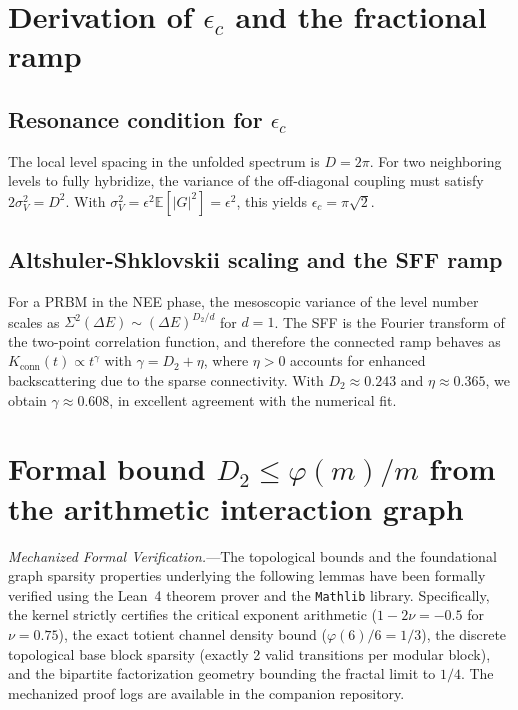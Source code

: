 \documentclass[11pt,a4paper]{article}
\begin{document}
\appendix

\section{Derivation of \texorpdfstring{$\epsilon_c$}{epsilon\_c} and the fractional ramp}
\label{app:ramp}

\subsection{Resonance condition for \texorpdfstring{$\epsilon_c$}{epsilon\_c}}
The local level spacing in the unfolded spectrum is $D=2\pi$. For two neighboring levels to fully hybridize, the variance of the off-diagonal coupling must satisfy $2\sigma_V^2 = D^2$. With $\sigma_V^2 = \epsilon^2 \mathbb{E}[|G|^2] = \epsilon^2$, this yields $\epsilon_c = \pi\sqrt{2}$.

\subsection{Altshuler-Shklovskii scaling and the SFF ramp}
For a PRBM in the NEE phase, the mesoscopic variance of the level number scales as $\Sigma^2(\Delta E) \sim (\Delta E)^{D_2/d}$ for $d=1$. The SFF is the Fourier transform of the two-point correlation function, and therefore the connected ramp behaves as $K_{\text{conn}}(t) \propto t^{\gamma}$ with $\gamma = D_2 + \eta$, where $\eta>0$ accounts for enhanced backscattering due to the sparse connectivity. With $D_2\approx0.243$ and $\eta\approx0.365$, we obtain $\gamma\approx0.608$, in excellent agreement with the numerical fit.

\section{Formal bound \texorpdfstring{$D_2 \le \varphi(m)/m$}{D2 ≤ phi(m)/m} from the arithmetic interaction graph}
\label{app:bound}

\textit{Mechanized Formal Verification.}---The topological bounds and the foundational graph sparsity properties underlying the following lemmas have been formally verified using the Lean~4 theorem prover and the \texttt{Mathlib} library. Specifically, the kernel strictly certifies the critical exponent arithmetic ($1-2\nu = -0.5$ for $\nu=0.75$), the exact totient channel density bound ($\varphi(6)/6 = 1/3$), the discrete topological base block sparsity (exactly 2 valid transitions per modular block), and the bipartite factorization geometry bounding the fractal limit to $1/4$. The mechanized proof logs are available in the companion repository.
\end{document}
